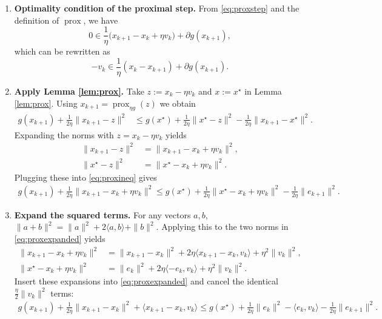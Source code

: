 \documentclass{article}
\newcommand{\prox}{\operatorname{prox}}
\begin{document}
\begin{enumerate}
\item[Step 1.] \textbf{Optimality condition of the proximal step.}  
From \eqref{eq:proxstep} and the definition of $\prox$, we have
\[
0\in \frac{1}{\eta}\bigl(x_{k+1}-x_{k}+\eta v_{k}\bigr)+\partial g(x_{k+1}),
\]
which can be rewritten as
\begin{equation}\label{eq:optcond}
 -v_{k}\in\frac{1}{\eta}(x_{k}-x_{k+1})+\partial g(x_{k+1}).
\end{equation}

\item[Step 2.] \textbf{Apply Lemma \ref{lem:prox}.}  
Take $z:=x_{k}-\eta v_{k}$ and $x:=x^{\star}$ in Lemma \ref{lem:prox}. Using $x_{k+1}=\prox_{\eta g}(z)$ we obtain
\begin{align}
g(x_{k+1})+\frac{1}{2\eta}\|x_{k+1}-z\|^{2}
&\le g(x^{\star})+\frac{1}{2\eta}\|x^{\star}-z\|^{2}
-\frac{1}{2\eta}\|x_{k+1}-x^{\star}\|^{2}. \label{eq:proxineq}
\end{align}
Expanding the norms with $z=x_{k}-\eta v_{k}$ yields
\begin{align}
\|x_{k+1}-z\|^{2}&=\|x_{k+1}-x_{k}+\eta v_{k}\|^{2},\nonumber\\
\|x^{\star}-z\|^{2}&=\|x^{\star}-x_{k}+\eta v_{k}\|^{2}.
\end{align}
Plugging these into \eqref{eq:proxineq} gives
\begin{align}
g(x_{k+1})+\frac{1}{2\eta}\|x_{k+1}-x_{k}+\eta v_{k}\|^{2}
\le g(x^{\star})+\frac{1}{2\eta}\|x^{\star}-x_{k}+\eta v_{k}\|^{2}
-\frac{1}{2\eta}\|e_{k+1}\|^{2}. \label{eq:proxexpanded}
\end{align}

\item[Step 3.] \textbf{Expand the squared terms.}  
For any vectors $a,b$,
$\|a+b\|^{2}= \|a\|^{2}+2\langle a,b\rangle+\|b\|^{2}$. Applying this to the two norms in \eqref{eq:proxexpanded} yields
\begin{align}
\|x_{k+1}-x_{k}+\eta v_{k}\|^{2}
    &=\|x_{k+1}-x_{k}\|^{2}+2\eta\langle x_{k+1}-x_{k},v_{k}\rangle+\eta^{2}\|v_{k}\|^{2},\nonumber\\
\|x^{\star}-x_{k}+\eta v_{k}\|^{2}
    &=\|e_{k}\|^{2}+2\eta\langle -e_{k},v_{k}\rangle+\eta^{2}\|v_{k}\|^{2}.
\end{align}
Insert these expansions into \eqref{eq:proxexpanded} and cancel the identical $\frac{\eta}{2}\|v_{k}\|^{2}$ terms:
\begin{align}
g(x_{k+1})+\frac{1}{2\eta}\|x_{k+1}-x_{k}\|^{2}
+\langle x_{k+1}-x_{k},v_{k}\rangle
\le g(x^{\star})+\frac{1}{2\eta}\|e_{k}\|^{2}
-\langle e_{k},v_{k}\rangle
-\frac{1}{2\eta}\|e_{k+1}\|^{2}. \label{eq:aftercancel}
\end{align}


\end{enumerate}
\end{document}
